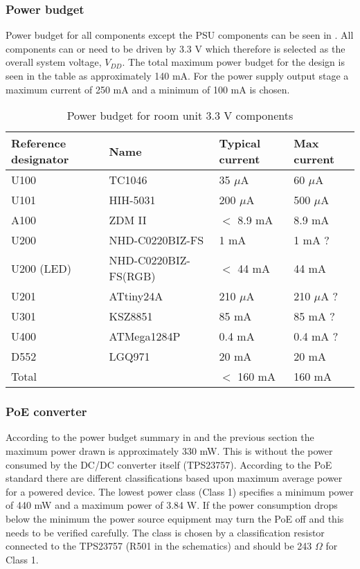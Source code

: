 \subsubsection{Power budget}
Power budget for all components except the PSU components can be seen
in . All components can or need to be
driven by 3.3 V which therefore is selected as the overall system
voltage, $V_{DD}$. The total maximum power budget for the design is
seen in the table as approximately 140 mA. For the power supply output
stage a maximum current of 250 mA and a minimum of 100 mA is chosen.

\begin{table}
\begin{tabular}{|l|l|l|l|}
\hline
Reference designator & Name        & Typical current & Max current\\
\hline
U100                 & TC1046      & 35 $\mu$A        & 60 $\mu$A\\
U101                 & HIH-5031    & 200 $\mu$A       & 500 $\mu$A\\
A100                 & ZDM II      & $<$ 8.9 mA          & 8.9 mA\\
U200                 & NHD-C0220BIZ-FS & 1 mA         & 1 mA ? \\
U200 (LED)           & NHD-C0220BIZ-FS(RGB) & $<$ 44 mA  & 44 mA \\
U201                 & ATtiny24A   & 210 $\mu$A       & 210 $\mu$A ? \\
U301                 & KSZ8851     & 85 mA            & 85 mA ? \\
U400                 & ATMega1284P & 0.4 mA           & 0.4 mA ? \\
D552                 & LGQ971      & 20 mA            & 20 mA \\
\hline
Total                &             & $<$ 160 mA            & 160 mA \\
\hline
\end{tabular}
\caption{Power budget for room unit 3.3 V components}
\label{tab:powerbudget_roomunit}
\end{table}


\subsubsection{PoE converter}
According to the power budget summary
in  and the previous section the
maximum power drawn is approximately 330 mW. This is without the power
consumed by the DC/DC converter itself (TPS23757). According to the
PoE standard there are different classifications based upon maximum
average power for a powered device. The lowest power class (Class 1)
specifies a minimum power of 440 mW and a maximum power of 3.84 W. If
the power consumption drops below the minimum the power source
equipment may turn the PoE off and this needs to be verified
carefully. The class is chosen by a classification resistor connected
to the TPS23757 (R501 in the schematics) and should be 243 $\Omega$
for Class 1.

